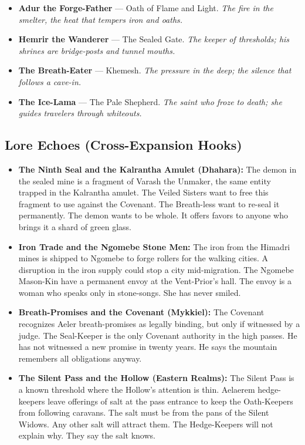 \begin{itemize}
\begin{itemize}
    \item \textbf{Adur the Forge-Father} --- Oath of Flame and Light. \textit{The fire in the smelter, the heat that tempers iron and oaths.}
    \item \textbf{Hemrir the Wanderer} --- The Sealed Gate. \textit{The keeper of thresholds; his shrines are bridge-posts and tunnel mouths.}
    \item \textbf{The Breath-Eater} --- Khemesh. \textit{The pressure in the deep; the silence that follows a cave-in.}
    \item \textbf{The Ice-Lama} --- The Pale Shepherd. \textit{The saint who froze to death; she guides travelers through whiteouts.}
  \end{itemize}
\end{itemize}

\subsection*{Lore Echoes (Cross-Expansion Hooks)}
\begin{itemize}
  \item \textbf{The Ninth Seal and the Kalrantha Amulet (Dhahara):} The demon in the sealed mine is a fragment of Varash the Unmaker, the same entity trapped in the Kalrantha amulet. The Veiled Sisters want to free this fragment to use against the Covenant. The Breath-less want to re-seal it permanently. The demon wants to be whole. It offers favors to anyone who brings it a shard of green glass.
  \item \textbf{Iron Trade and the Ngomebe Stone Men:} The iron from the Himadri mines is shipped to Ngomebe to forge rollers for the walking cities. A disruption in the iron supply could stop a city mid-migration. The Ngomebe Mason-Kin have a permanent envoy at the Vent-Prior's hall. The envoy is a woman who speaks only in stone-songs. She has never smiled.
  \item \textbf{Breath-Promises and the Covenant (Mykkiel):} The Covenant recognizes Aeler breath-promises as legally binding, but only if witnessed by a judge. The Seal-Keeper is the only Covenant authority in the high passes. He has not witnessed a new promise in twenty years. He says the mountain remembers all obligations anyway.
  \item \textbf{The Silent Pass and the Hollow (Eastern Realms):} The Silent Pass is a known threshold where the Hollow's attention is thin. Aelaerem hedge-keepers leave offerings of salt at the pass entrance to keep the Oath-Keepers from following caravans. The salt must be from the pans of the Silent Widows. Any other salt will attract them. The Hedge-Keepers will not explain why. They say the salt knows.
\end{itemize}

